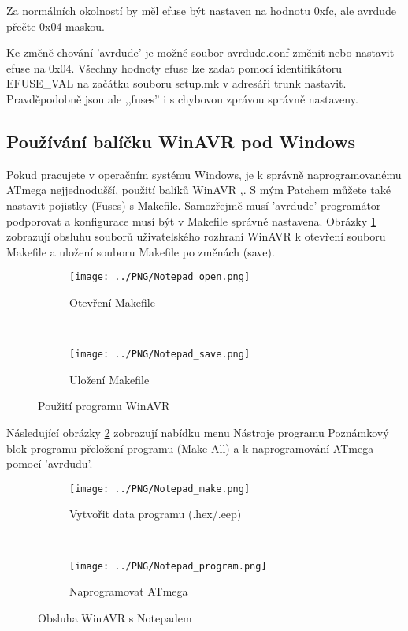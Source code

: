 Za normálních okolností by měl efuse být nastaven na hodnotu 0xfc, ale avrdude přečte 0x04 maskou.

Ke změně chování 'avrdude' je možné soubor avrdude.conf změnit nebo nastavit efuse na 0x04.
Všechny hodnoty efuse lze zadat pomocí identifikátoru EFUSE\_VAL na začátku souboru setup.mk v adresáři
trunk nastavit. Pravděpodobně jsou ale ,,fuses'' i s chybovou zprávou správně nastaveny.
\newpage
\subsection{Používání balíčku WinAVR pod Windows}
\vspace{-0,3 cm}
Pokud pracujete v operačním systému Windows, je k správně naprogramovanému ATmega nejjednodušší,
použití balíků WinAVR \cite{winavr1},\cite{winavr2}.
S mým Patchem \cite{winavr3} můžete také nastavit pojistky (Fuses) s Makefile. Samozřejmě musí 'avrdude' programátor podporovat a konfigurace musí být v Makefile správně nastavena.
Obrázky \ref{fig:WinAVR1} zobrazují obsluhu souborů uživatelského rozhraní WinAVR k otevření souboru Makefile a uložení souboru Makefile po změnách (save).
\begin{figure}[H]
  \begin{subfigure}[b]{8cm}
    \centering
    \texttt{[image: ../PNG/Notepad\_open.png]}
    \caption{Otevření Makefile}
  \end{subfigure}
  ~
  \begin{subfigure}[b]{9cm}
    \centering
    \texttt{[image: ../PNG/Notepad\_save.png]}
    \caption{Uložení Makefile}
  \end{subfigure}
\vspace{-0,3 cm}
  \caption{Použití programu WinAVR}
  \label{fig:WinAVR1}
\end{figure}
\vspace{-0,3 cm}
Následující obrázky \ref{fig:WinAVR2} zobrazují nabídku menu Nástroje programu Poznámkový blok
programu přeložení programu (Make All) a k naprogramování ATmega pomocí 'avrdudu'.

\begin{figure}[H]
  \begin{subfigure}[b]{8cm}
    \centering
    \texttt{[image: ../PNG/Notepad\_make.png]}
    \caption{Vytvořit data programu (.hex/.eep)}
  \end{subfigure}
  ~
  \begin{subfigure}[b]{9cm}
    \centering
    \texttt{[image: ../PNG/Notepad\_program.png]}
    \caption{Naprogramovat ATmega}
  \end{subfigure}
  \vspace{-0,3 cm}
  \caption{Obsluha WinAVR s Notepadem}
  \label{fig:WinAVR2}
\end{figure}

